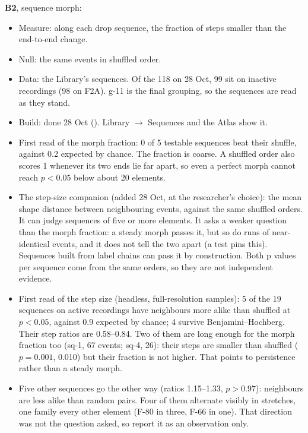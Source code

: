 \begin{instructions}
\textbf{B2}, sequence morph:
\begin{itemize}
  \item Measure: along each drop sequence, the fraction of steps smaller than the end-to-end change.
  \item Null: the same events in shuffled order.
  \item Data: the Library's sequences. Of the 118 on 28 Oct, 99 sit on inactive recordings (98 on F2A). g-11 is the
        final grouping, so the sequences are read as they stand.
  \item Build: done 28 Oct (). Library $\rightarrow$ Sequences and the Atlas show it.
  \item First read of the morph fraction: 0 of 5 testable sequences beat their shuffle, against 0.2 expected by chance.
        The fraction is coarse. A shuffled order also scores 1 whenever its two ends lie far apart, so even a perfect
        morph cannot reach $p<0.05$ below about 20 elements.
  \item The step-size companion (added 28 Oct, at the researcher's choice): the mean shape distance between
        neighbouring events, against the same shuffled orders. It can judge sequences of five or more elements. It asks
        a weaker question than the morph fraction: a steady morph passes it, but so do runs of near-identical events,
        and it does not tell the two apart (a test pins this). Sequences built from label chains can pass it by
        construction. Both p values per sequence come from the same orders, so they are not independent evidence.
  \item First read of the step size (headless, full-resolution samples): 5 of the 19 sequences on active recordings
        have neighbours more alike than shuffled at $p<0.05$, against 0.9 expected by chance; 4 survive
        Benjamini--Hochberg. Their step ratios are 0.58--0.84. Two of them are long enough for the morph fraction too
        (sq-1, 67 events; sq-4, 26): their steps are smaller than shuffled ($p=0.001$, 0.010) but their fraction is
        not higher. That points to persistence rather than a steady morph.
  \item Five other sequences go the other way (ratios 1.15--1.33, $p>0.97$): neighbours are less alike than random
        pairs. Four of them alternate visibly in stretches, one family every other element (F-80 in three, F-66 in one). That
        direction was not the question asked, so report it as an observation only.
\end{itemize}
\end{instructions}

